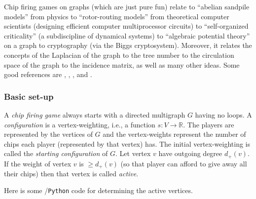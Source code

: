 Chip firing games on graphs (which are just
pure fun) relate to ``abelian sandpile models'' from physics to
``rotor-routing models'' from theoretical computer scientists
(designing efficient computer multiprocessor circuits) to ``self-organized
criticality'' (a subdiscipline of dynamical systems) to
``algebraic potential theory'' on a graph \cite{Biggs1997} to cryptography
(via the Biggs cryptosystem). Moreover, it relates the concepts of the
Laplacian of the graph to the tree number to the circulation space
of the graph to the incidence matrix, as well as many other
ideas. Some good references are \cite{Durgin2009}, \cite{PerkinsonEtAl2009},
\cite{Perlman2009}, \cite{HolroydEtAl2008} and \cite{Biggs1999}.

\subsubsection{Basic set-up}

A {\it chip firing game} always starts with a directed
multigraph $G$ having no loops. A {\it configuration} is a
vertex-weighting, i.e., a function
$s:V\to {\mathbb{R}}$. The players are represented by the
vertices of $G$ and the vertex-weights represent the number of
chips each player (represented by that vertex) has.
The initial vertex-weighting is called the {\it starting configuration} of $G$.
Let vertex $v$ have outgoing degree $d_+(v)$. If the weight of
vertex $v$ is $\geq d_+(v)$ (so that player can afford to give away
all their chips) then that vertex is called {\it active}.

Here is some \sage/{\tt Python} code for determining the active vertices.

